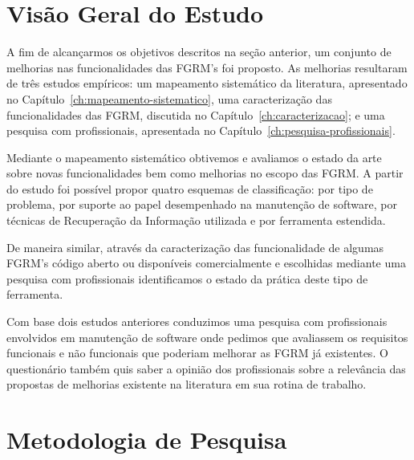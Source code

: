\section{Visão Geral do Estudo}
\label{sec:intro-visao-geral}


A fim de alcançarmos os objetivos descritos na seção anterior, um conjunto de
melhorias nas funcionalidades das FGRM's foi proposto. As melhorias resultaram
de três estudos empíricos: um mapeamento sistemático da literatura, apresentado
no Capítulo~\ref{ch:mapeamento-sistematico}, uma caracterização das
funcionalidades das FGRM, discutida no Capítulo~\ref{ch:caracterizacao}; e uma
pesquisa com profissionais, apresentada no
Capítulo~\ref{ch:pesquisa-profissionais}.

Mediante o mapeamento sistemático obtivemos e avaliamos o estado da arte sobre
novas funcionalidades bem como melhorias no escopo das FGRM\@. A partir do
estudo foi possível propor quatro esquemas de classificação: por tipo de
problema, por suporte ao papel desempenhado na manutenção de software, por
técnicas de Recuperação da Informação utilizada e por ferramenta
estendida.

De maneira similar, através da caracterização das funcionalidade de algumas
FGRM's código aberto ou disponíveis comercialmente e escolhidas mediante uma
pesquisa com profissionais identificamos o estado da prática deste tipo de
ferramenta.

Com base dois estudos anteriores conduzimos uma pesquisa com profissionais
envolvidos em manutenção de software onde pedimos que avaliassem os requisitos
funcionais e não funcionais que poderiam melhorar as FGRM já existentes. O
questionário também quis saber a opinião dos profissionais sobre a relevância
das propostas de melhorias existente na literatura em sua rotina de
trabalho.

\section{Metodologia de Pesquisa}
\label{sec:intro-metodologia}


